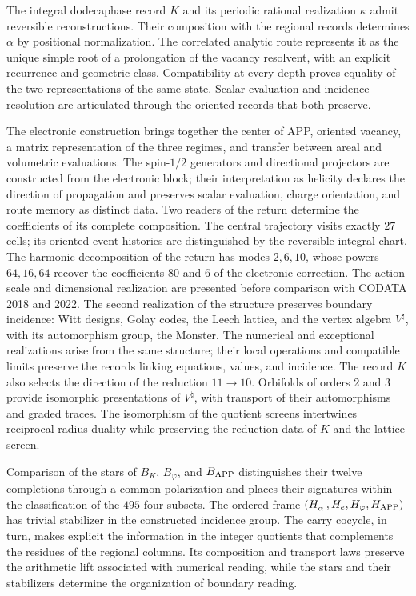 The integral dodecaphase record \(K\) and its periodic rational realization
\(\kappa\) admit reversible reconstructions. Their composition with the regional
records determines \(\alpha\) by positional normalization. The correlated
analytic route represents it as the unique simple root of a prolongation
of the vacancy resolvent, with an explicit recurrence and geometric class.
Compatibility at every depth proves equality of the two representations
of the same state. Scalar evaluation and incidence resolution
are articulated through the oriented records that both preserve.

The electronic construction brings together the center of APP, oriented vacancy,
a matrix representation of the three regimes, and transfer between
areal and volumetric evaluations. The spin-\(1/2\) generators and directional
projectors are constructed from the electronic block; their interpretation
as helicity declares the direction of propagation and preserves scalar
evaluation, charge orientation, and route memory as distinct data.
Two readers of the return determine
the coefficients of its complete composition. The central trajectory visits
exactly \(27\) cells; its oriented event histories are distinguished by
the reversible integral chart. The harmonic decomposition of the return
has modes \(2,6,10\), whose powers \(64,16,64\) recover the coefficients
\(80\) and \(6\) of the electronic correction.
The action scale and
dimensional realization are presented before comparison with CODATA 2018 and
2022. The second realization of the structure preserves boundary
incidence: Witt designs, Golay codes, the Leech lattice, and the vertex
algebra \(V^\natural\), with its automorphism group, the Monster.
The numerical and exceptional realizations arise from the same structure;
their local operations and compatible limits preserve the records
linking equations, values, and incidence.
The record \(K\) also selects the direction of the reduction
\(11\to10\). Orbifolds of orders \(2\) and \(3\) provide isomorphic
presentations of \(V^\natural\), with transport of their automorphisms
and graded traces. The isomorphism of the quotient screens intertwines
reciprocal-radius duality while preserving the reduction data of
\(K\) and the lattice screen.

Comparison of the stars of \(B_K\), \(B_\varphi\), and
\(B_{\rm APP}\) distinguishes their twelve completions through a common
polarization and places their signatures within the classification of
the \(495\) four-subsets. The ordered frame
\((H^-_\alpha,H_e,H_\varphi,H_{\rm APP})\) has trivial stabilizer
in the constructed incidence group. The carry cocycle, in turn,
makes explicit the information in the integer quotients that complements
the residues of the regional columns. Its composition and transport laws
preserve the arithmetic lift associated with numerical reading, while
the stars and their stabilizers determine the organization of boundary
reading.

